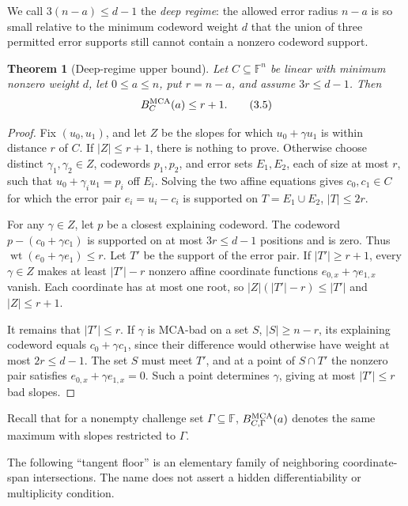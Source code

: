 \documentclass[12pt,a4paper]{amsart}
\numberwithin{equation}{section}
\newtheorem{theorem}{Theorem}[section]
\theoremstyle{remark}
\DeclareMathOperator{\wt}{wt}
\newcommand{\F}{\mathbb F}
\newcommand{\abs}[1]{\lvert #1\rvert}
\begin{document}
We call \(3(n-a)\le d-1\) the \emph{deep regime}: the allowed error
radius \(n-a\) is so small relative to the minimum codeword weight \(d\)
that the union of three permitted error supports still cannot contain a
nonzero codeword support.

\begin{theorem}[Deep-regime upper bound]\label{thm:deep-regime-upper}
Let \(C\subseteq\F^n\) be linear with minimum nonzero weight \(d\), let
\(0\le a\le n\), put \(r=n-a\), and assume \(3r\le d-1\).  Then
\[
 B_C^{\rm MCA}(a)\le r+1.
 \tag{3.5}\label{eq:deep-upper}
\]
\end{theorem}

\begin{proof}
Fix \((u_0,u_1)\), and let \(Z\) be the slopes for which \(u_0+\gamma u_1\)
is within distance \(r\) of \(C\).  If \(\abs Z\le r+1\), there is nothing
to prove.  Otherwise choose distinct \(\gamma_1,\gamma_2\in Z\), codewords
\(p_1,p_2\), and error sets \(E_1,E_2\), each of size at most \(r\), such
that \(u_0+\gamma_i u_1=p_i\) off \(E_i\).  Solving the two affine
equations gives \(c_0,c_1\in C\) for which the error pair
\(e_i=u_i-c_i\) is supported on \(T=E_1\cup E_2\), \(\abs T\le2r\).

For any \(\gamma\in Z\), let \(p\) be a closest explaining codeword.  The
codeword \(p-(c_0+\gamma c_1)\) is supported on at most \(3r\le d-1\)
positions and is zero.  Thus \(\wt(e_0+\gamma e_1)\le r\).  Let \(T'\) be
the support of the error pair.  If \(\abs{T'}\ge r+1\), every
\(\gamma\in Z\) makes at least \(\abs{T'}-r\) nonzero affine coordinate
functions \(e_{0,x}+\gamma e_{1,x}\) vanish.  Each coordinate has at most
one root, so \(\abs Z(\abs{T'}-r)\le\abs{T'}\) and \(\abs Z\le r+1\).

It remains that \(\abs{T'}\le r\).  If \(\gamma\) is MCA-bad on a set
\(S\), \(\abs S\ge n-r\), its explaining codeword equals
\(c_0+\gamma c_1\), since their difference would otherwise have weight at
most \(2r\le d-1\).  The set \(S\) must meet \(T'\), and at a point of
\(S\cap T'\) the nonzero pair satisfies
\(e_{0,x}+\gamma e_{1,x}=0\).  Such a point determines \(\gamma\), giving
at most \(\abs{T'}\le r\) bad slopes.
\end{proof}

Recall that for a nonempty challenge set \(\Gamma\subseteq\F\),
\(B_{C,\Gamma}^{\rm MCA}(a)\) denotes the same maximum with slopes restricted to
\(\Gamma\).

The following ``tangent floor'' is an elementary family of neighboring
coordinate-span intersections.  The name does not assert a hidden
differentiability or multiplicity condition.
\end{document}
